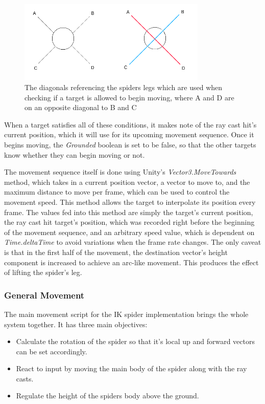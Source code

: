 \begin{figure}
    \centering
    \captionsetup{justification=centering}
    \includegraphics[width=0.8\textwidth]{grafika/diagonals.png}
    \caption{The diagonals referencing the spiders legs which are used when
    checking if a target is allowed to begin moving, where A and D are on an
opposite diagonal to B and C}
    \label{fig:diagonals}
\end{figure}

When a target satisfies all of these conditions, it makes note of the ray cast
hit's current position, which it will use for its upcoming movement sequence.
Once it begins moving, the \textit{Grounded} boolean is set to be false, so that
the other targets know whether they can begin moving or not.

The movement sequence itself is done using Unity's \textit{Vector3.MoveTowards}
method, which takes in a current position vector, a vector to move to, and the
maximum distance to move per frame, which can be used to control the movement
speed. This method allows the target to interpolate its position every frame.
The values fed into this method are simply the target's current position, the
ray cast hit target's position, which was recorded right before the beginning of
the movement sequence, and an arbitrary speed value, which is dependent on
\textit{Time.deltaTime} to avoid variations when the frame rate changes. The
only caveat is that in the first half of the movement, the destination vector's
height component is increased to achieve an arc-like movement. This produces the
effect of lifting the spider's leg.

\subsubsection{General Movement}
The main movement script for the IK spider implementation brings the whole
system together. It has three main objectives:

\begin{itemize}

    \item Calculate the rotation of the spider so that it's local up and forward
        vectors can be set accordingly.

    \item React to input by moving the main body of the spider along with the
        ray casts.

    \item Regulate the height of the spiders body above the ground.

\end{itemize}

